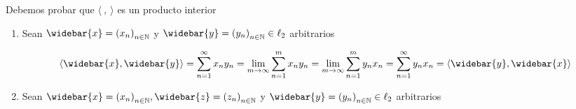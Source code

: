 \begin{proofexplanation}
    Debemos probar que $\langle \: , \: \rangle$ es un producto interior

    \begin{enumerate}
        \item Sean $\widebar{x} = {({x}_{n})}_{n \in \N}$ y $\widebar{y} = {({y}_{n})}_{n \in \N} \in \ell_2$ arbitrarios

        \begin{equation*}
            \langle \widebar{x}, \widebar{y} \rangle  = \sum\limits_{n=1}^{\infty} {x}_{n} {y}_{n} = \lim\limits_{m \to \infty} \sum\limits_{n=1}^{m} {x}_{n} {y}_{n} =  \lim\limits_{m \to \infty} \sum\limits_{n=1}^{m} {y}_{n} {x}_{n} = \sum\limits_{n=1}^{\infty} {y}_{n} {x}_{n} =  \langle \widebar{y}, \widebar{x} \rangle
        \end{equation*}

        \item Sean $\widebar{x} = {({x}_{n})}_{n \in \N}, \widebar{z} = {({z}_{n})}_{n \in \N}$ y $\widebar{y} = {({y}_{n})}_{n \in \N} \in \ell_2$ arbitrarios


\end{enumerate}
\end{proofexplanation}
